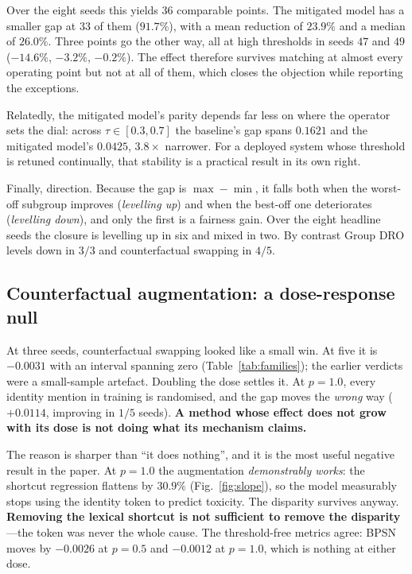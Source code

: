 \documentclass[conference]{IEEEtran}
\begin{document}
Over the eight seeds this yields $36$ comparable points. The mitigated model has
a smaller gap at $33$ of them ($91.7\%$), with a mean reduction of $23.9\%$ and a
median of $26.0\%$. Three points go the other way, all at high thresholds in
seeds $47$ and $49$ ($-14.6\%$, $-3.2\%$, $-0.2\%$). The effect therefore
survives matching at almost every operating point but not at all of them, which
closes the objection while reporting the exceptions.

Relatedly, the mitigated model's parity depends far less on where the operator
sets the dial: across $\tau \in [0.3, 0.7]$ the baseline's gap spans $0.1621$ and
the mitigated model's $0.0425$, $3.8\times$ narrower. For a deployed system whose
threshold is retuned continually, that stability is a practical result in its own
right.

Finally, direction. Because the gap is $\max - \min$, it falls both when the
worst-off subgroup improves (\emph{levelling up}) and when the best-off one
deteriorates (\emph{levelling down}), and only the first is a fairness gain. Over
the eight headline seeds the closure is levelling up in six and mixed in two.
By contrast Group DRO levels down in $3/3$ and counterfactual swapping in $4/5$.

\subsection{Counterfactual augmentation: a dose-response null}
\label{sec:cda}
At three seeds, counterfactual swapping looked like a small win. At five it is
$-0.0031$ with an interval spanning zero (Table~\ref{tab:families}); the earlier
verdicts were a small-sample artefact. Doubling the dose settles it. At
$p = 1.0$, every identity mention in training is randomised, and the gap moves
the \emph{wrong} way ($+0.0114$, improving in $1/5$ seeds). \textbf{A method whose
effect does not grow with its dose is not doing what its mechanism claims.}

The reason is sharper than ``it does nothing'', and it is the most useful negative
result in the paper. At $p = 1.0$ the augmentation \emph{demonstrably works}: the
shortcut regression flattens by $30.9\%$ (Fig.~\ref{fig:slope}), so the model
measurably stops using the identity token to predict toxicity. The disparity
survives anyway. \textbf{Removing the lexical shortcut is not sufficient to remove
the disparity}---the token was never the whole cause. The threshold-free metrics
agree: BPSN moves by $-0.0026$ at $p = 0.5$ and $-0.0012$ at $p = 1.0$, which is
nothing at either dose.
\end{document}
